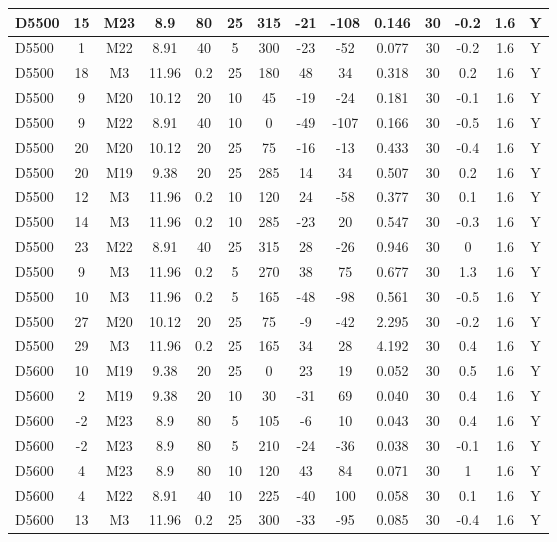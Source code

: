 \documentclass{article}
\begin{document}
\begin{center}
\begin{longtable}{|l|c|c|c|c|c|c|c|c|c|c|c|c|c|}
D5500	&	15	&	M23	&	8.9	&	80	&	25	&	315	&	-21	&	-108	&	0.146	&	30	&	-0.2	&	1.6	&	Y	\\\hline
D5500	&	1	&	M22	&	8.91	&	40	&	5	&	300	&	-23	&	-52	&	0.077	&	30	&	-0.2	&	1.6	&	Y	\\\hline
D5500	&	18	&	M3	&	11.96	&	0.2	&	25	&	180	&	48	&	34	&	0.318	&	30	&	0.2	&	1.6	&	Y	\\\hline
D5500	&	9	&	M20	&	10.12	&	20	&	10	&	45	&	-19	&	-24	&	0.181	&	30	&	-0.1	&	1.6	&	Y	\\\hline
D5500	&	9	&	M22	&	8.91	&	40	&	10	&	0	&	-49	&	-107	&	0.166	&	30	&	-0.5	&	1.6	&	Y	\\\hline
D5500	&	20	&	M20	&	10.12	&	20	&	25	&	75	&	-16	&	-13	&	0.433	&	30	&	-0.4	&	1.6	&	Y	\\\hline
D5500	&	20	&	M19	&	9.38	&	20	&	25	&	285	&	14	&	34	&	0.507	&	30	&	0.2	&	1.6	&	Y	\\\hline
D5500	&	12	&	M3	&	11.96	&	0.2	&	10	&	120	&	24	&	-58	&	0.377	&	30	&	0.1	&	1.6	&	Y	\\\hline
D5500	&	14	&	M3	&	11.96	&	0.2	&	10	&	285	&	-23	&	20	&	0.547	&	30	&	-0.3	&	1.6	&	Y	\\\hline
D5500	&	23	&	M22	&	8.91	&	40	&	25	&	315	&	28	&	-26	&	0.946	&	30	&	0	&	1.6	&	Y	\\\hline
D5500	&	9	&	M3	&	11.96	&	0.2	&	5	&	270	&	38	&	75	&	0.677	&	30	&	1.3	&	1.6	&	Y	\\\hline
D5500	&	10	&	M3	&	11.96	&	0.2	&	5	&	165	&	-48	&	-98	&	0.561	&	30	&	-0.5	&	1.6	&	Y	\\\hline
D5500	&	27	&	M20	&	10.12	&	20	&	25	&	75	&	-9	&	-42	&	2.295	&	30	&	-0.2	&	1.6	&	Y	\\\hline
D5500	&	29	&	M3	&	11.96	&	0.2	&	25	&	165	&	34	&	28	&	4.192	&	30	&	0.4	&	1.6	&	Y	\\\hline
D5600	&	10	&	M19	&	9.38	&	20	&	25	&	0	&	23	&	19	&	0.052	&	30	&	0.5	&	1.6	&	Y	\\\hline
D5600	&	2	&	M19	&	9.38	&	20	&	10	&	30	&	-31	&	69	&	0.040	&	30	&	0.4	&	1.6	&	Y	\\\hline
D5600	&	-2	&	M23	&	8.9	&	80	&	5	&	105	&	-6	&	10	&	0.043	&	30	&	0.4	&	1.6	&	Y	\\\hline
D5600	&	-2	&	M23	&	8.9	&	80	&	5	&	210	&	-24	&	-36	&	0.038	&	30	&	-0.1	&	1.6	&	Y	\\\hline
D5600	&	4	&	M23	&	8.9	&	80	&	10	&	120	&	43	&	84	&	0.071	&	30	&	1	&	1.6	&	Y	\\\hline
D5600	&	4	&	M22	&	8.91	&	40	&	10	&	225	&	-40	&	100	&	0.058	&	30	&	0.1	&	1.6	&	Y	\\\hline
D5600	&	13	&	M3	&	11.96	&	0.2	&	25	&	300	&	-33	&	-95	&	0.085	&	30	&	-0.4	&	1.6	&	Y	\\\hline

\end{longtable}
\end{center}
\end{document}
